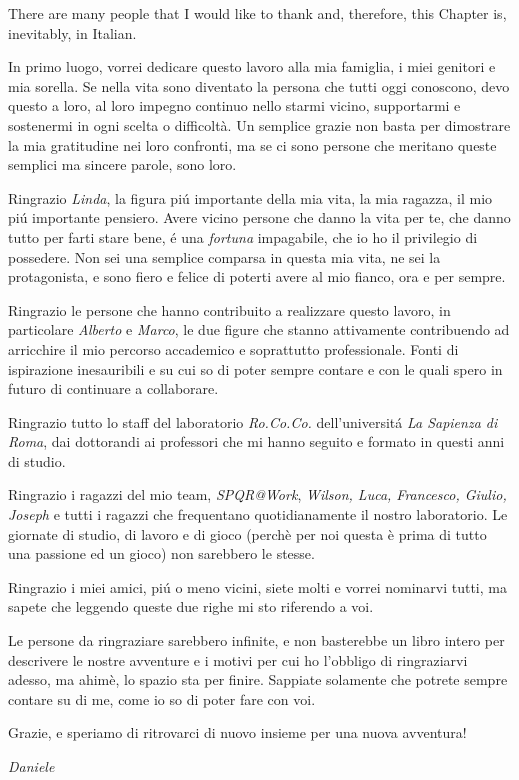 \begin{acknowledgements}
There are many people that I would like to thank and, therefore, this Chapter is, inevitably, in Italian.

In primo luogo, vorrei dedicare questo lavoro alla mia famiglia, i miei genitori e mia sorella. Se nella vita sono diventato la persona che tutti oggi conoscono, devo questo a loro, al loro impegno continuo nello starmi vicino, supportarmi e sostenermi in ogni scelta o difficoltà. Un semplice grazie non basta per dimostrare la mia gratitudine nei loro confronti, ma se ci sono persone che meritano queste semplici ma sincere parole, sono loro.

Ringrazio \emph{Linda}, la figura pi\'u importante della mia vita, la mia ragazza, il mio pi\'u importante pensiero. Avere vicino persone che danno la vita per te, che danno tutto per farti stare bene, \'e una \emph{fortuna} impagabile, che io ho il privilegio di possedere. Non sei una semplice comparsa in questa mia vita, ne sei la protagonista, e sono fiero e felice di poterti avere al mio fianco, ora e per sempre.

Ringrazio le persone che hanno contribuito a realizzare questo lavoro, in particolare \emph{Alberto} e \emph{Marco}, le due figure che stanno attivamente contribuendo ad arricchire il mio percorso accademico e soprattutto professionale. Fonti di ispirazione inesauribili e su cui so di poter sempre contare e con le quali spero in futuro di continuare a collaborare.

Ringrazio tutto lo staff del laboratorio \emph{Ro.Co.Co.} dell'universit\'a \emph{La Sapienza di Roma}, dai dottorandi ai professori che mi hanno seguito e formato in questi anni di studio.

Ringrazio i ragazzi del mio team, \emph{SPQR@Work}, \emph{Wilson, Luca, Francesco, Giulio, Joseph} e tutti i ragazzi che frequentano quotidianamente il nostro laboratorio. Le giornate di studio, di lavoro e di gioco (perchè per noi questa è prima di tutto una passione ed un gioco) non sarebbero le stesse.

Ringrazio i miei amici, pi\'u o meno vicini, siete molti e vorrei nominarvi tutti, ma sapete che leggendo queste due righe mi sto riferendo a voi.

Le persone da ringraziare sarebbero infinite, e non basterebbe un libro intero per descrivere le nostre avventure e i motivi per cui ho l'obbligo di ringraziarvi adesso, ma ahimè, lo spazio sta per finire. Sappiate solamente che potrete sempre contare su di me, come io so di poter fare con voi.

Grazie, e speriamo di ritrovarci di nuovo insieme per una nuova avventura!

\emph{Daniele}
\end{acknowledgements}